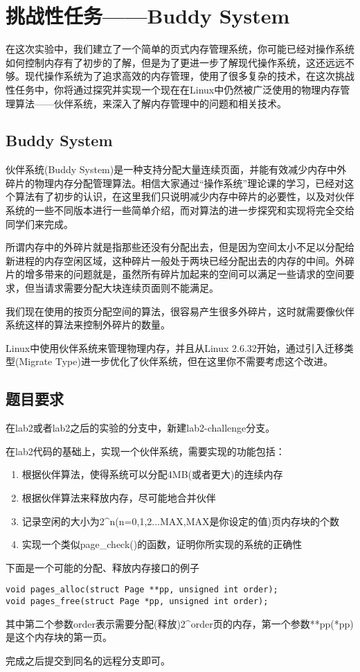 \section{挑战性任务——Buddy System}

在这次实验中，我们建立了一个简单的页式内存管理系统，你可能已经对操作系统如何控制内存有了初步的了解，但是为了更进一步了解现代操作系统，这还远远不够。现代操作系统为了追求高效的内存管理，使用了很多复杂的技术，在这次挑战性任务中，你将通过探究并实现一个现在在Linux中仍然被广泛使用的物理内存管理算法——伙伴系统，来深入了解内存管理中的问题和相关技术。


\subsection{Buddy System}

伙伴系统(Buddy System)是一种支持分配大量连续页面，并能有效减少内存中外碎片的物理内存分配管理算法。相信大家通过“操作系统”理论课的学习，已经对这个算法有了初步的认识，在这里我们只说明减少内存中碎片的必要性，以及对伙伴系统的一些不同版本进行一些简单介绍，而对算法的进一步探究和实现将完全交给同学们来完成。

所谓内存中的外碎片就是指那些还没有分配出去，但是因为空间太小不足以分配给新进程的内存空闲区域，这种碎片一般处于两块已经分配出去的内存的中间。外碎片的增多带来的问题就是，虽然所有碎片加起来的空间可以满足一些请求的空间要求，但当请求需要分配大块连续页面则不能满足。

我们现在使用的按页分配空间的算法，很容易产生很多外碎片，这时就需要像伙伴系统这样的算法来控制外碎片的数量。

Linux中使用伙伴系统来管理物理内存，并且从Linux 2.6.32开始，通过引入迁移类型(Migrate Type)进一步优化了伙伴系统，但在这里你不需要考虑这个改进。

\subsection{题目要求}
在lab2或者lab2之后的实验的分支中，新建lab2-challenge分支。

在lab2代码的基础上，实现一个伙伴系统，需要实现的功能包括：

\begin{enumerate}
  \item 根据伙伴算法，使得系统可以分配4MB(或者更大)的连续内存
  \item 根据伙伴算法来释放内存，尽可能地合并伙伴
  \item 记录空闲的大小为2\^{}n(n=0,1,2...MAX,MAX是你设定的值)页内存块的个数
  \item 实现一个类似page\_check()的函数，证明你所实现的系统的正确性
\end{enumerate}

下面是一个可能的分配、释放内存接口的例子

\begin{verbatim}
void pages_alloc(struct Page **pp, unsigned int order);
void pages_free(struct Page *pp, unsigned int order);
\end{verbatim}

其中第二个参数order表示需要分配(释放)2\^{}order页的内存，第一个参数**pp(*pp)是这个内存块的第一页。

完成之后提交到同名的远程分支即可。